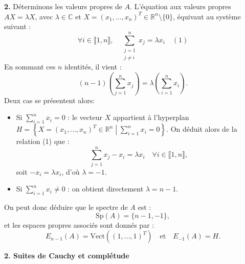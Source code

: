 \documentclass[11pt,a4paper]{article}
\begin{document}
\vspace{0.4cm}

\textbf{2.} Déterminons les valeurs propres de $A$. L'équation aux valeurs propres $AX = \lambda X$, avec $\lambda \in \mathbb{C}$ et $X = (x_1, \dots, x_n)^T \in \mathbb{R}^n \setminus \{0\}$, équivaut au système suivant :
\[
\forall i \in \llbracket 1,n \rrbracket, \quad \sum_{\substack{j=1 \\ j \neq i}}^n x_j = \lambda x_i \quad (1)
\]
En sommant ces $n$ identités, il vient :
\[
(n-1) \left( \sum_{j=1}^n x_j \right) = \lambda \left( \sum_{i=1}^n x_i \right).
\]
Deux cas se présentent alors:
\begin{itemize}
    \item[\textbf{--}] Si $\sum_{i=1}^n x_i = 0$ : le vecteur $X$ appartient à l'hyperplan $H = \left\{ X = (x_1, \dots, x_n)^T \in \mathbb{R}^n \;\left|\; \sum_{i=1}^n x_i = 0 \right.\right\}$. On déduit alors de la relation (1) que :
    \[
    \sum_{j=1}^n x_j - x_i = \lambda x_i \quad \forall i \in \llbracket 1,n \rrbracket,
    \]
    soit $-x_i = \lambda x_i$, d'où $\lambda = -1$.
    \item[\textbf{--}] Si $\sum_{i=1}^n x_i \neq 0$ : on obtient directement $\lambda = n-1$.
\end{itemize}
On peut donc déduire que le spectre de $A$ est :
\[
\boxed{\mathrm{Sp}(A) = \{n-1, -1\},}
\]
et les espaces propres associés sont donnés par :
\[
\boxed{E_{n-1}(A) = \mathrm{Vect}\left((1, \dots, 1)^T\right) \quad \text{et} \quad E_{-1}(A) = H.}
\]

\begin{center}
    \large \textbf{2. Suites de Cauchy et complétude}
\end{center}
\vspace{0.2cm}
\end{document}
